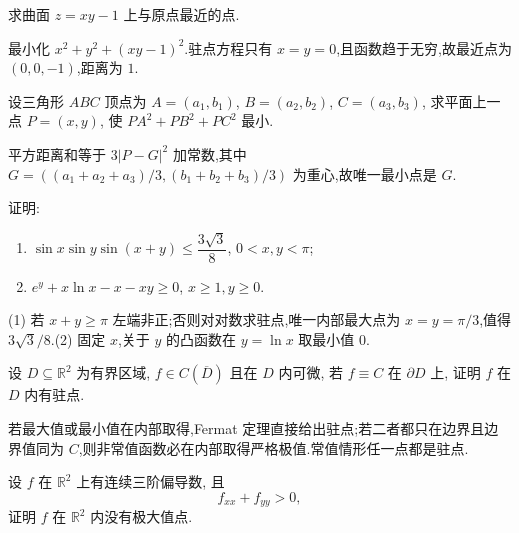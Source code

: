 \begin{example}
    求曲面 $z=xy-1$ 上与原点最近的点.
\end{example}
\exampleblank

\begin{solution}
    最小化 $x^2+y^2+(xy-1)^2$.驻点方程只有 $x=y=0$,且函数趋于无穷,故最近点为 $(0,0,-1)$,距离为 $1$.
\end{solution}

\begin{example}
    设三角形 $ABC$ 顶点为 $A=(a_1,b_1)$, $B=(a_2,b_2)$, $C=(a_3,b_3)$, 求平面上一点 $P=(x,y)$, 使 $PA^2+PB^2+PC^2$ 最小.
\end{example}
\exampleblank

\begin{solution}
    平方距离和等于 $3|P-G|^2$ 加常数,其中
    $G=((a_1+a_2+a_3)/3,(b_1+b_2+b_3)/3)$ 为重心,故唯一最小点是 $G$.
\end{solution}

\begin{example}
    证明:
    \begin{enumerate}
        \item $\sin x\sin y\sin(x+y)\leq\dfrac{3\sqrt3}{8}$, $0<x,y<\pi$;
        \item $e^y+x\ln x-x-xy\geq0$, $x\geq1,y\geq0$.
    \end{enumerate}
\end{example}
\exampleblank

\begin{solution}
    (1) 若 $x+y\geq\pi$ 左端非正;否则对对数求驻点,唯一内部最大点为 $x=y=\pi/3$,值得 $3\sqrt{3}/8$.(2) 固定 $x$,关于 $y$ 的凸函数在 $y=\ln x$ 取最小值 $0$.
\end{solution}

\begin{example}
    设 $D\subseteq\mathbb{R}^2$ 为有界区域, $f\in C(\overline D)$ 且在 $D$ 内可微, 若 $f\equiv C$ 在 $\partial D$ 上, 证明 $f$ 在 $D$ 内有驻点.
\end{example}
\exampleblank

\begin{solution}
    若最大值或最小值在内部取得,Fermat 定理直接给出驻点;若二者都只在边界且边界值同为 $C$,则非常值函数必在内部取得严格极值.常值情形任一点都是驻点.
\end{solution}

\begin{example}
    设 $f$ 在 $\mathbb{R}^2$ 上有连续三阶偏导数, 且
    \[
        f_{xx}+f_{yy}>0,
    \]
    证明 $f$ 在 $\mathbb{R}^2$ 内没有极大值点.
\end{example}
\exampleblank

